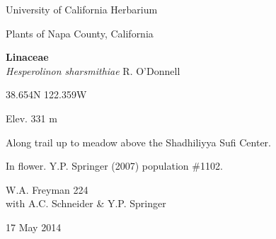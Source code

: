 \documentclass[letterpaper,10pt]{article}
\begin{document}
\begin{minipage}[t]{0.40\textwidth}

\begin{center}
University of California Herbarium \\
\begin{large}
Plants of Napa County, California \\
\end{large}
\vspace{\baselineskip}
\textbf{Linaceae} \\
\textit{Hesperolinon sharsmithiae} R. O'Donnell\\
\end{center}

\begin{footnotesize}

\begin{multicols}{2}
38.654\textdegree N 122.359\textdegree W
\columnbreak
\begin{flushright}
Elev. 331 m
\end{flushright}
\end{multicols}

Along trail up to meadow above the Shadhiliyya Sufi Center.
\vspace{\baselineskip}

In flower. Y.P. Springer (2007) population \#1102.

\begin{multicols}{2}
W.A. Freyman 224 \\
with A.C. Schneider \& Y.P. Springer
\columnbreak
\begin{flushright}
17 May 2014
\end{flushright}
\end{multicols}

\end{footnotesize}

\end{minipage}

\vspace{2cm}
%
%

%
%
\end{document}
